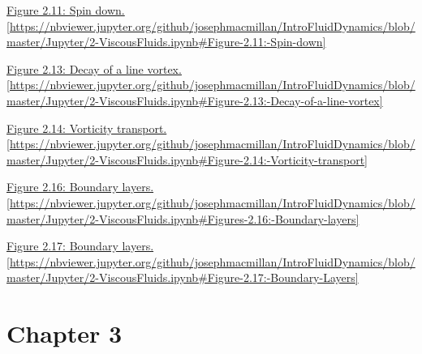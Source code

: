 \vspace{0.1in}

\noindent \href{https://nbviewer.jupyter.org/github/josephmacmillan/IntroFluidDynamics/blob/master/Jupyter/2-ViscousFluids.ipynb#Figure-2.11:-Spin-down}{Figure 2.11: Spin down. [\url{https://nbviewer.jupyter.org/github/josephmacmillan/IntroFluidDynamics/blob/master/Jupyter/2-ViscousFluids.ipynb\#Figure-2.11:-Spin-down}]}

\vspace{0.1in}

\noindent \href{https://nbviewer.jupyter.org/github/josephmacmillan/IntroFluidDynamics/blob/master/Jupyter/2-ViscousFluids.ipynb#Figure-2.13:-Decay-of-a-line-vortex}{Figure 2.13: Decay of a line vortex. [\url{https://nbviewer.jupyter.org/github/josephmacmillan/IntroFluidDynamics/blob/master/Jupyter/2-ViscousFluids.ipynb\#Figure-2.13:-Decay-of-a-line-vortex}]}

\vspace{0.1in}

\noindent \href{https://nbviewer.jupyter.org/github/josephmacmillan/IntroFluidDynamics/blob/master/Jupyter/2-ViscousFluids.ipynb#Figure-2.14:-Vorticity-transport}{Figure 2.14: Vorticity transport. [\url{https://nbviewer.jupyter.org/github/josephmacmillan/IntroFluidDynamics/blob/master/Jupyter/2-ViscousFluids.ipynb\#Figure-2.14:-Vorticity-transport}]}

\vspace{0.1in}

\noindent \href{https://nbviewer.jupyter.org/github/josephmacmillan/IntroFluidDynamics/blob/master/Jupyter/2-ViscousFluids.ipynb#Figures-2.16:-Boundary-layers}{Figure 2.16: Boundary layers. [\url{https://nbviewer.jupyter.org/github/josephmacmillan/IntroFluidDynamics/blob/master/Jupyter/2-ViscousFluids.ipynb\#Figures-2.16:-Boundary-layers}]}

\vspace{0.1in}

\noindent \href{https://nbviewer.jupyter.org/github/josephmacmillan/IntroFluidDynamics/blob/master/Jupyter/2-ViscousFluids.ipynb#Figure-2.17:-Boundary-Layers}{Figure 2.17: Boundary layers. [\url{https://nbviewer.jupyter.org/github/josephmacmillan/IntroFluidDynamics/blob/master/Jupyter/2-ViscousFluids.ipynb\#Figure-2.17:-Boundary-Layers}]}

\section{Chapter 3}


